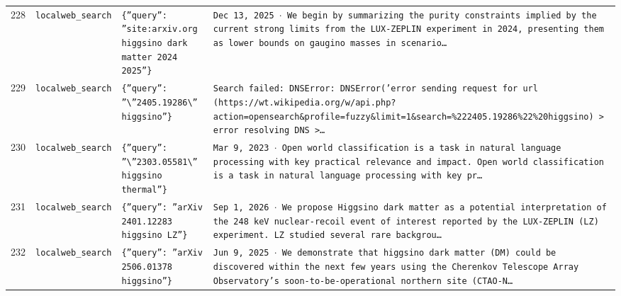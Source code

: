 \documentclass[11pt,a4paper]{article}
\begin{document}
\begin{longtable}{@{}p{}p{}p{}p{}@{}}
228 & \texttt{local}\newline\texttt{web\_\allowbreak{}search} & \texttt{\{''query'':\allowbreak{} ''site:\allowbreak{}arxiv.org higgsino dark matter 2024 2025''\}\allowbreak{}} & \texttt{Dec 13,\allowbreak{} 2025 $\cdot$ We begin by summarizing the purity constraints implied by the current strong limits from the LUX-ZEPLIN experiment in 2024,\allowbreak{} presenting them as lower bounds on gaugino masses in scenario\ldots{}\allowbreak{}} \\
229 & \texttt{local}\newline\texttt{web\_\allowbreak{}search} & \texttt{\{''query'':\allowbreak{} ''\textbackslash{}\allowbreak{}''2405.19286\textbackslash{}\allowbreak{}'' higgsino''\}\allowbreak{}} & \texttt{Search failed:\allowbreak{} DNSError:\allowbreak{} DNSError('error sending request for url (https:\allowbreak{}/\allowbreak{}/\allowbreak{}wt.wikipedia.org/\allowbreak{}w/\allowbreak{}api.php?action=\allowbreak{}opensearch\&profile=\allowbreak{}fuzzy\&limit=\allowbreak{}1\&search=\allowbreak{}\%222405.19286\%22\%20higgsino)\allowbreak{} \textgreater{}\allowbreak{} error resolving DNS \textgreater{}\allowbreak{}\ldots{}\allowbreak{}} \\
230 & \texttt{local}\newline\texttt{web\_\allowbreak{}search} & \texttt{\{''query'':\allowbreak{} ''\textbackslash{}\allowbreak{}''2303.05581\textbackslash{}\allowbreak{}'' higgsino thermal''\}\allowbreak{}} & \texttt{Mar 9,\allowbreak{} 2023 $\cdot$ Open world classification is a task in natural language processing with key practical relevance and impact. Open world classification is a task in natural language processing with key pr\ldots{}\allowbreak{}} \\
231 & \texttt{local}\newline\texttt{web\_\allowbreak{}search} & \texttt{\{''query'':\allowbreak{} ''arXiv 2401.12283 higgsino LZ''\}\allowbreak{}} & \texttt{Sep 1,\allowbreak{} 2026 $\cdot$ We propose Higgsino dark matter as a potential interpretation of the 248 keV nuclear-recoil event of interest reported by the LUX-ZEPLIN (LZ)\allowbreak{} experiment. LZ studied several rare backgrou\ldots{}\allowbreak{}} \\
232 & \texttt{local}\newline\texttt{web\_\allowbreak{}search} & \texttt{\{''query'':\allowbreak{} ''arXiv 2506.01378 higgsino''\}\allowbreak{}} & \texttt{Jun 9,\allowbreak{} 2025 $\cdot$ We demonstrate that higgsino dark matter (DM)\allowbreak{} could be discovered within the next few years using the Cherenkov Telescope Array Observatory's soon-to-be-operational northern site (CTAO-N\ldots{}\allowbreak{}} \\

\end{longtable}
\end{document}
